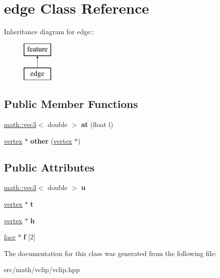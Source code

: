 \hypertarget{classedge}{
\section{edge Class Reference}
\label{classedge}
}
Inheritance diagram for edge::\begin{figure}[H]
\begin{center}
\leavevmode
\includegraphics[height=2cm]{classedge}
\end{center}
\end{figure}
\subsection*{Public Member Functions}
\begin{DoxyCompactItemize}
\item 
\hypertarget{classedge_a28b0db507f26f75b1932ec8c1bf31372}{
\hyperlink{classmath_1_1vec3}{math::vec3}$<$ double $>$ {\bfseries at} (float l)}
\label{classedge_a28b0db507f26f75b1932ec8c1bf31372}

\item 
\hypertarget{classedge_a0fea19012bb1bb4a15e3412977e5d161}{
\hyperlink{classvertex}{vertex} $\ast$ {\bfseries other} (\hyperlink{classvertex}{vertex} $\ast$)}
\label{classedge_a0fea19012bb1bb4a15e3412977e5d161}

\end{DoxyCompactItemize}
\subsection*{Public Attributes}
\begin{DoxyCompactItemize}
\item 
\hypertarget{classedge_a5b47227c4e85aaf3f69fc4d40bb47da5}{
\hyperlink{classmath_1_1vec3}{math::vec3}$<$ double $>$ {\bfseries u}}
\label{classedge_a5b47227c4e85aaf3f69fc4d40bb47da5}

\item 
\hypertarget{classedge_a6c0eb36b7ec40943fcd633c3eda2a206}{
\hyperlink{classvertex}{vertex} $\ast$ {\bfseries t}}
\label{classedge_a6c0eb36b7ec40943fcd633c3eda2a206}

\item 
\hypertarget{classedge_aab93143962ff82c557e7796151d4809f}{
\hyperlink{classvertex}{vertex} $\ast$ {\bfseries h}}
\label{classedge_aab93143962ff82c557e7796151d4809f}

\item 
\hypertarget{classedge_a32f90bcc15f534bc1bd03a535274bacc}{
\hyperlink{classface}{face} $\ast$ {\bfseries f} \mbox{[}2\mbox{]}}
\label{classedge_a32f90bcc15f534bc1bd03a535274bacc}

\end{DoxyCompactItemize}


The documentation for this class was generated from the following file:\begin{DoxyCompactItemize}
\item 
src/math/vclip/vclip.hpp\end{DoxyCompactItemize}
